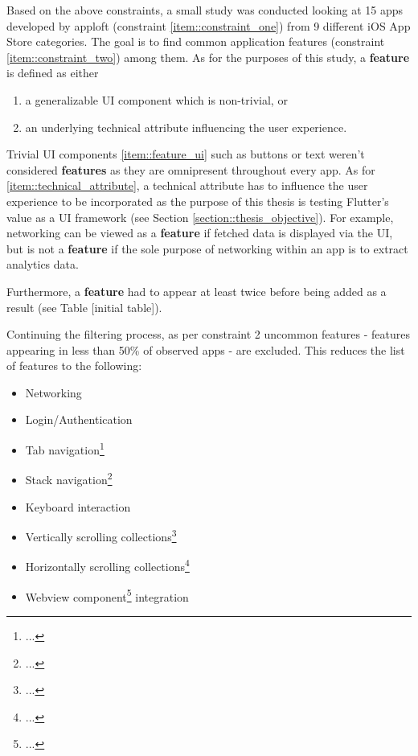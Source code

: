 Based on the above constraints, a small study was conducted looking at 15 apps developed by apploft (constraint \ref{item::constraint_one}) from 9 different iOS App Store categories. 
The goal is to find common application features (constraint \ref{item::constraint_two}) among them.
As for the purposes of this study, a \textbf{feature} is defined as either 
\begin{enumerate}[label=(\alph*)]
    \item a generalizable UI component which is non-trivial, or \label{item::feature_ui}
    \item an underlying technical attribute influencing the user experience. \label{item::technical_attribute}
\end{enumerate}

Trivial UI components \ref{item::feature_ui} such as buttons or text weren't considered \textbf{features} as they are omnipresent throughout every app.
As for \ref{item::technical_attribute}, a technical attribute has to influence the user experience to be incorporated as the purpose of this thesis is testing Flutter's value as a UI framework (see Section \ref{section::thesis_objective}).
For example, networking can be viewed as a \textbf{feature} if fetched data is displayed via the UI, but is not a \textbf{feature} if the sole purpose of networking within 
an app is to extract analytics data.

Furthermore, a \textbf{feature} had to appear at least twice before being added as a result (see
Table [initial table]).

Continuing the filtering process, as per constraint 2 uncommon features - features appearing
in less than 50\% of observed apps - are excluded. This reduces the list of features to the following:


\begin{itemize}
    \item Networking
    \item Login/Authentication
    \item Tab navigation\footnote{...}
    \item Stack navigation\footnote{...}
    \item Keyboard interaction
    \item Vertically scrolling collections\footnote{...}
    \item Horizontally scrolling collections\footnote{...}
    \item Webview component\footnote{...} integration
\end{itemize}

